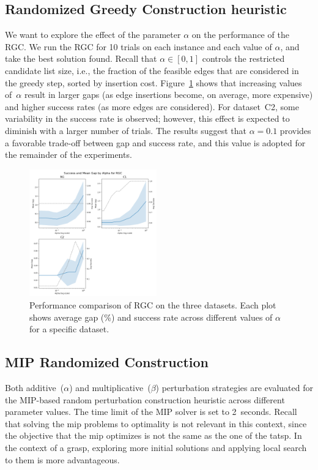 \documentclass[twocolumn, switch]{article} %
\begin{document}
\subsection{Randomized Greedy Construction heuristic}
We want to explore the effect of the parameter $\alpha$ on the performance of the RGC.
We run the RGC for 10 trials on each instance and each value of $\alpha$, and take the best solution found.
Recall that $\alpha \in [0, 1]$ controls the restricted candidate list size, i.e., the fraction of the feasible edges that are considered in the greedy step, sorted by insertion cost.
Figure~\ref{fig:alpha_vs_mean_gap_randomized_greedy} shows that increasing values of~$\alpha$ result in larger gaps (as edge insertions become, on average, more expensive) and higher success rates (as more edges are considered). For dataset~C2, some variability in the success rate is observed; however, this effect is expected to diminish with a larger number of trials. The results suggest that $\alpha = 0.1$ provides a favorable trade-off between gap and success rate, and this value is adopted for the remainder of the experiments.

\begin{figure}[h]
    \centering
    \includegraphics[width=0.49\textwidth]{figures/alpha_vs_mean_gap_randomized_greedy.png}
    \caption{Performance comparison of RGC on the three datasets. Each plot shows average gap (\%) and success rate across different values of $\alpha$ for a specific dataset.}
    \label{fig:alpha_vs_mean_gap_randomized_greedy}
\end{figure}


\subsection{MIP Randomized Construction}

Both additive~($\alpha$) and multiplicative~($\beta$) perturbation strategies are evaluated for the MIP-based random perturbation construction heuristic across different parameter values. The time limit of the MIP solver is set to 2~seconds.
Recall that solving the \gls{mip} problems to optimality is not relevant in this context, since the objective that the \gls{mip} optimizes is not
the same as the one of the \gls{tatsp}. In the context of a \gls{grasp}, exploring more initial solutions and applying local search to them is more advantageous.
\end{document}
